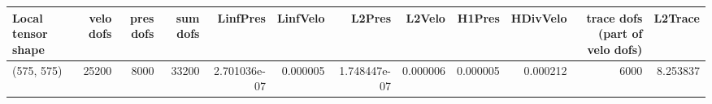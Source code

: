 \begin{tabular}{lrrrrrrrrrrr}
\toprule
Local tensor shape &  velo dofs &  pres dofs &  sum dofs &     LinfPres &  LinfVelo &       L2Pres &   L2Velo &   H1Pres &  HDivVelo &  trace dofs (part of velo dofs) &  L2Trace \\
\midrule
        (575, 575) &      25200 &       8000 &     33200 & 2.701036e-07 &  0.000005 & 1.748447e-07 & 0.000006 & 0.000005 &  0.000212 &                            6000 & 8.253837 \\
\bottomrule
\end{tabular}
